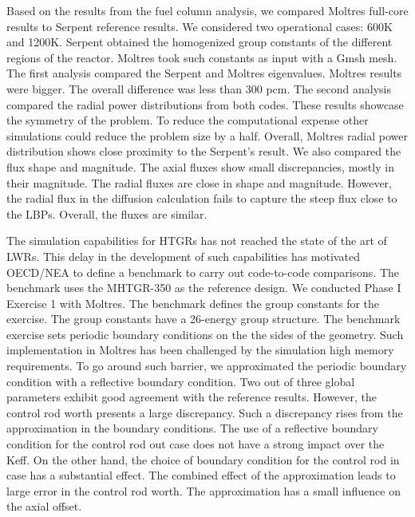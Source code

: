 \documentclass[11pt,letterpaper]{article}
\begin{document}
Based on the results from the fuel column analysis, we compared Moltres full-core results to Serpent reference results.
We considered two operational cases: 600K and 1200K.
Serpent obtained the homogenized group constants of the different regions of the reactor.
Moltres took such constants as input with a Gmsh mesh.
The first analysis compared the Serpent and Moltres eigenvalues.
Moltres results were bigger.
The overall difference was less than 300 pcm.
The second analysis compared the radial power distributions from both codes.
These results showcase the symmetry of the problem.
To reduce the computational expense other simulations could reduce the problem size by a half.
Overall, Moltres radial power distribution shows close proximity to the Serpent's result.
We also compared the flux shape and magnitude.
The axial fluxes show small discrepancies, mostly in their magnitude.
The radial fluxes are close in shape and magnitude.
However, the radial flux in the diffusion calculation fails to capture the steep flux close to the LBPs.
Overall, the fluxes are similar.

The simulation capabilities for HTGRs has not reached the state of the art of LWRs.
This delay in the development of such capabilities has motivated OECD/NEA to define a benchmark to carry out code-to-code comparisons.
The benchmark uses the MHTGR-350 as the reference design.
We conducted Phase I Exercise 1 with Moltres.
The benchmark defines the group constants for the exercise.
The group constants have a 26-energy group structure.
The benchmark exercise sets periodic boundary conditions on the the sides of the geometry.
Such implementation in Moltres has been challenged by the simulation high memory requirements.
To go around such barrier, we approximated the periodic boundary condition with a reflective boundary condition.
Two out of three global parameters exhibit good agreement with the reference results.
However, the control rod worth presents a large discrepancy.
Such a discrepancy rises from the approximation in the boundary conditions.
The use of a reflective boundary condition for the control rod out case does not have a strong impact over the \gls{Keff}.
On the other hand, the choice of boundary condition for the control rod in case has a substantial effect.
The combined effect of the approximation leads to large error in the control rod worth.
The approximation has a small influence on the axial offset.

\pagebreak


\end{document}
